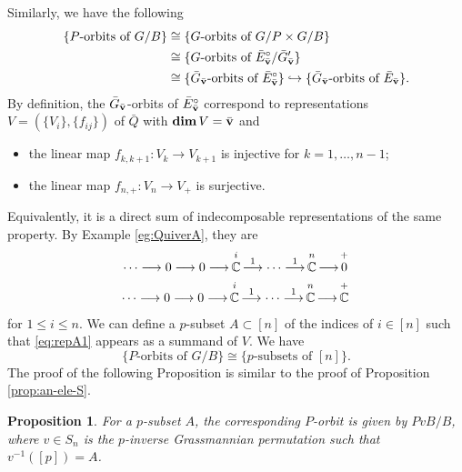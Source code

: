 \documentclass[12pt,reqno]{amsart}
\numberwithin{equation}{section}
\newtheorem{prop}[theorem]{Proposition}
\theoremstyle{definition}
\begin{document}
Similarly, we have the following 
$$\begin{aligned}
\{\text{$P$-orbits of $G/B$}\}
& \cong \{\text{$G$-orbits of $G/P\times G/B$}\}\\
& \cong \{\text{$G$-orbits of $\bar{E}_{\bar{\mathbf{v}}}^\circ/\bar{G}_{\bar{\mathbf{v}}}'$}\}\\
& \cong \{\text{$\bar{G}_{\bar{\mathbf{v}}}$-orbits of $\bar{E}_{\bar{\mathbf{v}}}^\circ$}\}
\hookrightarrow 
\{\text{$\bar{G}_{\bar{\mathbf{v}}}$-orbits of $\bar{E}_{\bar{\mathbf{v}}}$}\}.
\end{aligned}$$
By  definition, the $\bar{G}_{\bar{\mathbf{v}}}$-orbits of $\bar{E}_{\bar{\mathbf{v}}}^\circ$ correspond to representations $V=(\{V_i\},\{f_{ij}\})$ of $\bar{Q}$ with $\operatorname{\mathbf{dim}} V=\bar{\mathbf{v}}$ and 
\begin{itemize}
    \item the linear map 
    $f_{k,k+1}:V_k\to V_{k+1}$ is injective for $k=1,\ldots,n-1$; 
    \item the linear map 
    $f_{n,+}:V_n\to V_+$ is surjective.
\end{itemize} 
Equivalently, it is a direct sum of indecomposable representations of the same property. 
By Example \eqref{eg:QuiverA}, they are 
\begin{gather}
\label{eq:repA0}
\cdots
\longrightarrow 0 
\longrightarrow 0 
\longrightarrow 
\stackrel{i}{\vphantom{\tfrac12}
\,\mathbb{C}\,} \stackrel{1}\longrightarrow \cdots \stackrel{1}\longrightarrow
\stackrel{n}{\vphantom{\tfrac12}
\,\mathbb{C}\,} 
\longrightarrow 
\stackrel{+}{\vphantom{\tfrac12}
\,0\,}\\
\label{eq:repA1}
\cdots
\longrightarrow 0 
\longrightarrow 0 
\longrightarrow 
\stackrel{i}{\vphantom{\tfrac12}
\,\mathbb{C}\,} \stackrel{1}\longrightarrow \cdots \stackrel{1}\longrightarrow
\stackrel{n}{\vphantom{\tfrac12}
\,\mathbb{C}\,} 
\longrightarrow 
\stackrel{+}{\vphantom{\tfrac12}
\,\mathbb{C}\,} 
\end{gather}
for $1\leq i\leq n$. 
We can define a $p$-subset $A\subset [n]$ of the indices of $i\in [n]$ such that \eqref{eq:repA1} appears as a summand of $V$. 
We have 
$$\{\text{$P$-orbits of $G/B$}\}
\cong \{\text{$p$-subsets of $[n]$}\}.$$
The proof of the following Proposition is similar to the proof of Proposition \ref{prop:an-ele-S}. 

\begin{prop}\label{prop:Porbis}
For a $p$-subset $A$, 
the corresponding $P$-orbit is given by $PvB/B$, 
where $v\in S_n$ is the $p$-inverse Grassmannian permutation such that  $v^{-1}([p])=A$. 
\end{prop}
\end{document}
